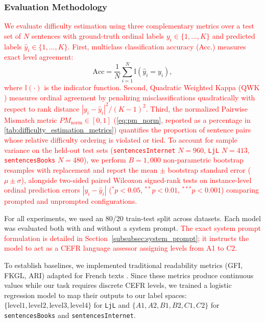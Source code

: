 \subsubsection{Evaluation Methodology}
\label{sec:difficulty_estimation_evaluation}

\textcolor{red}{We evaluate difficulty estimation using three complementary metrics over a test set of $N$ sentences with ground-truth ordinal labels $y_i \in \{1, \dots, K\}$ and predicted labels $\hat{y}_i \in \{1, \dots, K\}$. First, multiclass classification accuracy (Acc.) measures exact level agreement:}
{\color{red}\begin{equation}\label{eq:accuracy_def}
\text{Acc} = \frac{1}{N} \sum_{i=1}^{N} \mathbb{I}(\hat{y}_i = y_i),
\end{equation}}
\textcolor{red}{where $\mathbb{I}(\cdot)$ is the indicator function. Second, Quadratic Weighted Kappa ($\text{QWK}$) \cite{martinc2021supervised} measures ordinal agreement by penalizing misclassifications quadratically with respect to rank distance $|y_i - \hat{y}_i|^2 / (K-1)^2$. Third, the normalized Pairwise Mismatch metric $PM_{\text{norm}} \in [0, 1]$ (\autoref{eq:pm_norm}, reported as a percentage in \autoref{tab:difficulty_estimation_metrics}) quantifies the proportion of sentence pairs whose relative difficulty ordering is violated or tied. To account for sample variance on the held-out test sets (\texttt{sentencesInternet} $N=960$, \texttt{LjL} $N=413$, \texttt{sentencesBooks} $N=480$), we perform $B = 1{,}000$ non-parametric bootstrap resamples with replacement and report the mean $\pm$ bootstrap standard error ($\mu \pm \sigma$), alongside two-sided paired Wilcoxon signed-rank tests on instance-level ordinal prediction errors $|y_i - \hat{y}_i|$ ($^{*}p < 0.05$, $^{**}p < 0.01$, $^{***}p < 0.001$) comparing prompted and unprompted configurations.}

For all experiments, we used an 80/20 train-test split across datasets. Each model was evaluated both with and without a system prompt. \textcolor{red}{The exact system prompt formulation is detailed in Section~\ref{subsubsec:system_prompt}; it instructs the model to act as a CEFR language assessor assigning levels from A1 to C2.}

To establish baselines, we implemented traditional readability metrics (GFI, FKGL, ARI) adapted for French texts \cite{franccois2012ai}. Since these metrics produce continuous values while our task requires discrete CEFR levels, we trained a logistic regression model to map their outputs to our label spaces: $\{\text{level1}, \text{level2}, \text{level3}, \text{level4}\}$ for \texttt{LjL} and $\{A1, A2, B1, B2, C1, C2\}$ for \texttt{sentencesBooks} and \texttt{sentencesInternet}.

